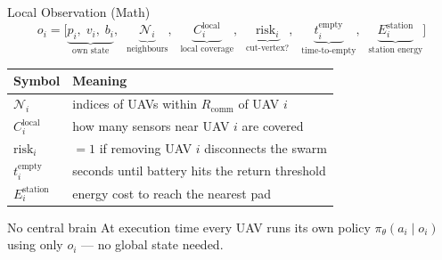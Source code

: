 \documentclass[aspectratio=169,12pt]{beamer}
\begin{document}
\begin{frame}{Local Observation (Math)}
\[
o_i = \bigl[
  \underbrace{p_i,\; v_i,\; b_i}_{\text{own state}},\;\;
  \underbrace{\mathcal{N}_i}_{\text{neighbours}},\;\;
  \underbrace{C_i^{\text{local}}}_{\text{local coverage}},\;\;
  \underbrace{\text{risk}_i}_{\text{cut-vertex?}},\;\;
  \underbrace{t_i^{\text{empty}}}_{\text{time-to-empty}},\;\;
  \underbrace{E_i^{\text{station}}}_{\text{station energy}}
\bigr]
\]

\vspace{0.5em}
\begin{tabular}{@{}ll@{}}
\toprule
\textbf{Symbol} & \textbf{Meaning} \\
\midrule
$\mathcal{N}_i$ & indices of UAVs within $R_{\text{comm}}$ of UAV $i$ \\
$C_i^{\text{local}}$ & how many sensors near UAV $i$ are covered \\
$\text{risk}_i$ & $=1$ if removing UAV $i$ disconnects the swarm \\
$t_i^{\text{empty}}$ & seconds until battery hits the return threshold \\
$E_i^{\text{station}}$ & energy cost to reach the nearest pad \\
\bottomrule
\end{tabular}

\vspace{0.4em}
\begin{alertblock}{No central brain}
At execution time every UAV runs its own policy $\pi_\theta(a_i \mid o_i)$
using only $o_i$ --- no global state needed.
\end{alertblock}
\end{frame}

\end{document}

